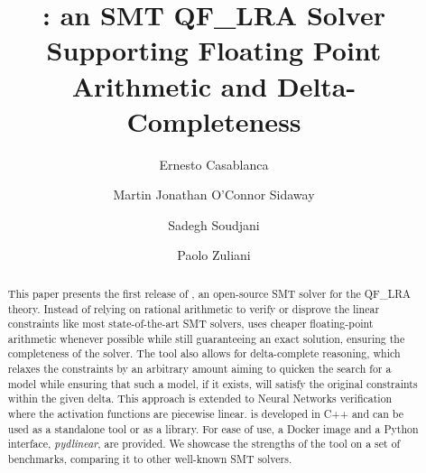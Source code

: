 \documentclass[runningheads]{llncs}
\begin{document}
\title{\dlinear: an SMT QF\_LRA Solver Supporting Floating Point Arithmetic and Delta-Completeness}
\titlerunning{\dlinear}

\author{Ernesto Casablanca
    \and
    Martin Jonathan O'Connor Sidaway
    \and
    Sadegh Soudjani
    \and
    Paolo Zuliani
}



\maketitle

\begin{abstract}
    This paper presents the first release of \dlinear, an open-source SMT solver for the QF\_LRA theory.
    Instead of relying on rational arithmetic to verify or disprove the linear constraints like most state-of-the-art SMT solvers, \dlinear uses cheaper floating-point arithmetic whenever possible while still guaranteeing an exact solution, ensuring the completeness of the solver.
    The tool also allows for delta-complete reasoning, which relaxes the constraints by an arbitrary amount aiming to quicken the search for a model while ensuring that such a model, if it exists, will satisfy the original constraints within the given delta.
    This approach is extended to Neural Networks verification where the activation functions are piecewise linear.
    \dlinear is developed in C++ and can be used as a standalone tool or as a library.
    For ease of use, a Docker image and a Python interface, \textit{pydlinear}, are provided.
    We showcase the strengths of the tool on a set of benchmarks, comparing it to other well-known SMT solvers.

\end{abstract}
\end{document}
